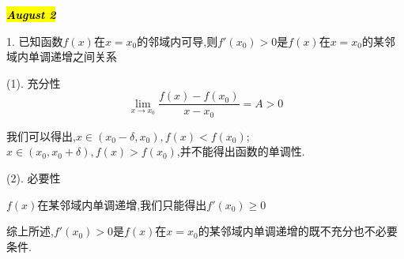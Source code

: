 \hl{\textbf{\textit{August 2}}}

1. 已知函数$f(x)$在$x=x_{0}$的邻域内可导,则$f'(x_{0})>0$是$f(x)$在$x=x_{0}$的某邻域内单调递增之间关系
\begin{solution}
	
	(1). 充分性
	$$\lim\limits_{x\rightarrow x_{0}}\dfrac{f(x)-f(x_{0})}{x-x_{0}}=A>0$$
	
	我们可以得出,$x\in(x_{0}-\delta,x_{0}),f(x)<f(x_{0})$;$x\in(x_{0},x_{0}+\delta),f(x)>f(x_{0})$,并不能得出函数的单调性.
	
	(2). 必要性
	
	$f(x)$在某邻域内单调递增,我们只能得出$f'(x_{0})\geq 0$
	
	综上所述,$f'(x_{0})>0$是$f(x)$在$x=x_{0}$的某邻域内单调递增的既不充分也不必要条件.
\end{solution}

